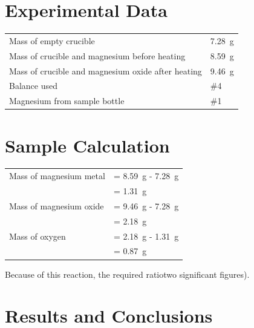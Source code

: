 \documentclass{article}
\begin{document}

\section{Experimental Data}

\begin{tabular}{ll}
Mass of empty crucible & \SI{7.28}{\gram}\\
Mass of crucible and magnesium before heating & \SI{8.59}{\gram}\\
Mass of crucible and magnesium oxide after heating & \SI{9.46}{\gram}\\
Balance used & \#4\\
Magnesium from sample bottle & \#1
\end{tabular}


\section{Sample Calculation}

\begin{tabular}{ll}
Mass of magnesium metal & = \SI{8.59}{\gram} - \SI{7.28}{\gram}\\
& = \SI{1.31}{\gram}\\
Mass of magnesium oxide & = \SI{9.46}{\gram} - \SI{7.28}{\gram}\\
& = \SI{2.18}{\gram}\\
Mass of oxygen & = \SI{2.18}{\gram} - \SI{1.31}{\gram}\\
& = \SI{0.87}{\gram}
\end{tabular}

Because of this reaction, the required ratiotwo significant figures).


\section{Results and Conclusions}
\end{document}
